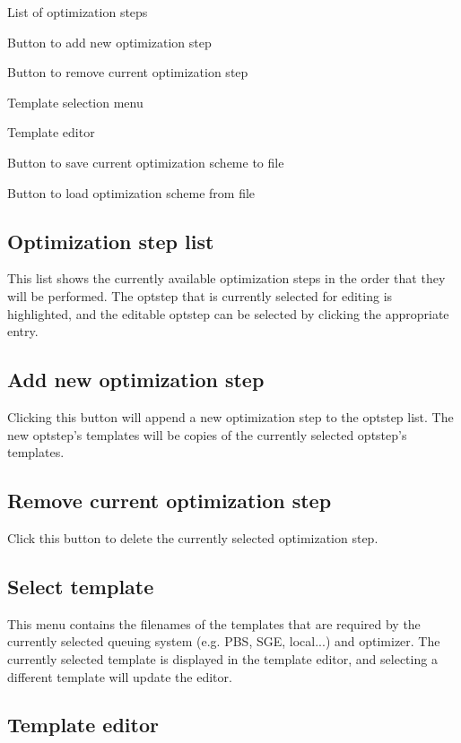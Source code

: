 \begin{DoxyEnumerate}
\item List of optimization steps
\item Button to add new optimization step
\item Button to remove current optimization step
\item Template selection menu
\item Template editor
\item Button to save current optimization scheme to file
\item Button to load optimization scheme from file
\end{DoxyEnumerate}\hypertarget{optschemes_gui-list}{}\subsection{Optimization step list}\label{optschemes_gui-list}
This list shows the currently available optimization steps in the order that they will be performed. The optstep that is currently selected for editing is highlighted, and the editable optstep can be selected by clicking the appropriate entry.\hypertarget{optschemes_gui-add}{}\subsection{Add new optimization step}\label{optschemes_gui-add}
Clicking this button will append a new optimization step to the optstep list. The new optstep's templates will be copies of the currently selected optstep's templates.\hypertarget{optschemes_gui-rem}{}\subsection{Remove current optimization step}\label{optschemes_gui-rem}
Click this button to delete the currently selected optimization step.\hypertarget{optschemes_gui-tselect}{}\subsection{Select template}\label{optschemes_gui-tselect}
This menu contains the filenames of the templates that are required by the currently selected queuing system (e.\-g. P\-B\-S, S\-G\-E, local...) and optimizer. The currently selected template is displayed in the template editor, and selecting a different template will update the editor.\hypertarget{optschemes_gui-editor}{}\subsection{Template editor}\label{optschemes_gui-editor}
